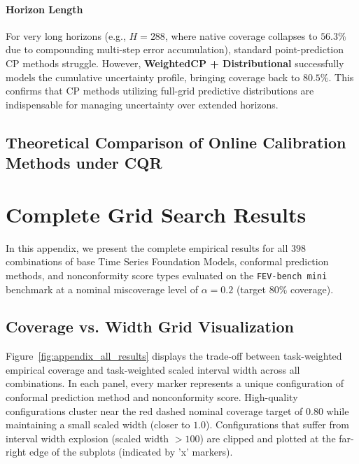 \documentclass[12pt, a4paper]{article}
\begin{document}
\paragraph{Horizon Length}
For very long horizons (e.g., \(H=288\), where native coverage collapses to \(56.3\%\) due to compounding multi-step error accumulation), standard point-prediction CP methods struggle. However, \textbf{WeightedCP + Distributional} successfully models the cumulative uncertainty profile, bringing coverage back to \(80.5\%\). This confirms that CP methods utilizing full-grid predictive distributions are indispensable for managing uncertainty over extended horizons.

\subsection{Theoretical Comparison of Online Calibration Methods under CQR}





\newpage
\appendix
\setcounter{table}{0}
\renewcommand{\thetable}{A\arabic{table}}
\renewcommand{\theHtable}{A\arabic{table}}
\setcounter{figure}{0}
\renewcommand{\thefigure}{A\arabic{figure}}
\renewcommand{\theHfigure}{A\arabic{figure}}

\section{Complete Grid Search Results} \label{sec:appendix_grid_search}
In this appendix, we present the complete empirical results for all \(398\) combinations of base Time Series Foundation Models, conformal prediction methods, and nonconformity score types evaluated on the \texttt{FEV-bench mini} benchmark at a nominal miscoverage level of \(\alpha = 0.2\) (target \(80\%\) coverage).

\subsection{Coverage vs. Width Grid Visualization}
Figure~\ref{fig:appendix_all_results} displays the trade-off between task-weighted empirical coverage and task-weighted scaled interval width across all combinations. In each panel, every marker represents a unique configuration of conformal prediction method and nonconformity score. High-quality configurations cluster near the red dashed nominal coverage target of \(0.80\) while maintaining a small scaled width (closer to \(1.0\)). Configurations that suffer from interval width explosion (scaled width \(> 100\)) are clipped and plotted at the far-right edge of the subplots (indicated by 'x' markers).
\end{document}
